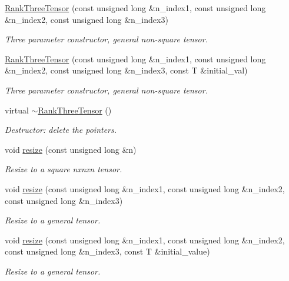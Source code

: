 \begin{DoxyCompactItemize}
\hyperlink{classoomph_1_1RankThreeTensor_ae876d81ad44aafcd195aeddfdfa913f7}{Rank\+Three\+Tensor} (const unsigned long \&n\+\_\+index1, const unsigned long \&n\+\_\+index2, const unsigned long \&n\+\_\+index3)
\begin{DoxyCompactList}\small\item\em Three parameter constructor, general non-\/square tensor. \end{DoxyCompactList}\item 
\hyperlink{classoomph_1_1RankThreeTensor_a3b3599070a42f679597bcd8a263aed25}{Rank\+Three\+Tensor} (const unsigned long \&n\+\_\+index1, const unsigned long \&n\+\_\+index2, const unsigned long \&n\+\_\+index3, const T \&initial\+\_\+val)
\begin{DoxyCompactList}\small\item\em Three parameter constructor, general non-\/square tensor. \end{DoxyCompactList}\item 
virtual \hyperlink{classoomph_1_1RankThreeTensor_a19b8797a792309e78106dbb2d90f83a7}{$\sim$\+Rank\+Three\+Tensor} ()
\begin{DoxyCompactList}\small\item\em Destructor\+: delete the pointers. \end{DoxyCompactList}\item 
void \hyperlink{classoomph_1_1RankThreeTensor_ab09490399cf8db93b08e07f893e8724d}{resize} (const unsigned long \&n)
\begin{DoxyCompactList}\small\item\em Resize to a square nxnxn tensor. \end{DoxyCompactList}\item 
void \hyperlink{classoomph_1_1RankThreeTensor_ac192a93e6971712de84c705895443544}{resize} (const unsigned long \&n\+\_\+index1, const unsigned long \&n\+\_\+index2, const unsigned long \&n\+\_\+index3)
\begin{DoxyCompactList}\small\item\em Resize to a general tensor. \end{DoxyCompactList}\item 
void \hyperlink{classoomph_1_1RankThreeTensor_a2b7967ca1fb782b26d9b2d9f0d760d16}{resize} (const unsigned long \&n\+\_\+index1, const unsigned long \&n\+\_\+index2, const unsigned long \&n\+\_\+index3, const T \&initial\+\_\+value)
\begin{DoxyCompactList}\small\item\em Resize to a general tensor. \end{DoxyCompactList}\item 

\end{DoxyCompactItemize}
